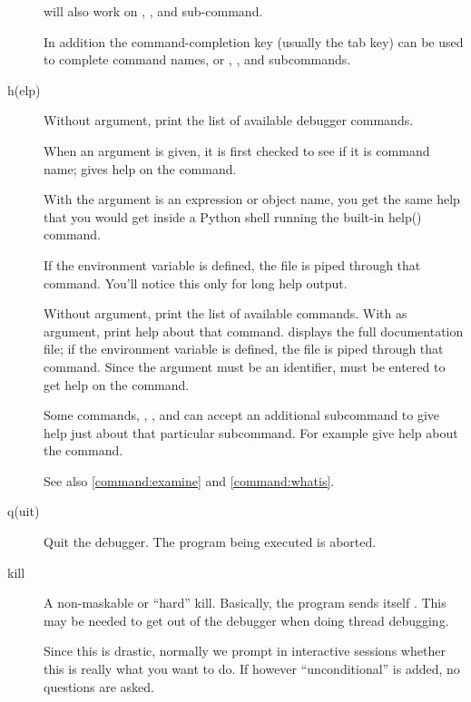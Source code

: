 \begin{description}
 will also work on , , and
 sub-command. 

In addition the command-completion key (usually the tab key) can be
used to complete command names, or , , and
 subcommands.

\item[h(elp) \optional{\var{command} \optional{\var{subcommand}}\code{\Large{|}}\var{expression}}]

Without argument, print the list of available debugger commands.

When an argument is given, it is first checked to see if it is command
name;  gives help on the \samp{!} command.

With the argument is an expression or object name, you get the same
help that you would get inside a Python shell running the built-in
help() command.

If the environment variable  is defined, the file is
piped through that command.  You'll notice this only for long help
output.

Without argument, print the list of available commands.  With
 as argument, print help about that command.   displays the full documentation file; if the environment
variable  is defined, the file is piped through that
command.  Since the  argument must be an identifier,
 must be entered to get help on the \samp{!} command.

Some commands, , , and  can accept an
additional subcommand to give help just about that particular
subcommand. For example  give help about the
 command.

See also \ref{command:examine} and \ref{command:whatis}.

\item[q(uit)]\label{command:quit}

Quit the debugger. The program being executed is aborted.

\item[kill \optional{unconditional}]\label{command:kill}

A non-maskable or ``hard'' kill. Basically, the program sends itself
. This may be needed to get out of the debugger when
doing thread debugging.

Since this is drastic, normally we prompt in interactive sessions
whether this is really what you want to do. If however
``unconditional'' is added, no questions are asked.


\end{description}
